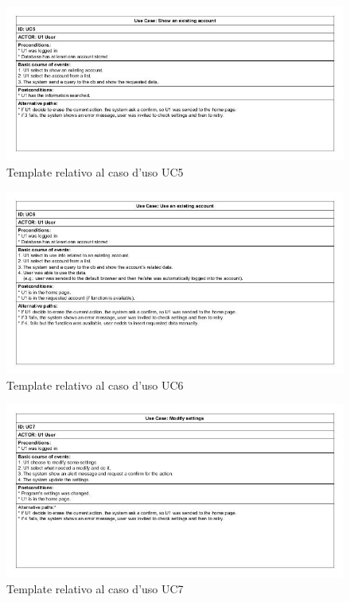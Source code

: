 \documentclass[a4paper,10pt]{report}
\begin{document}
			\begin{figure}[htbp]
				\centering
				\includegraphics[width = \textwidth]{immagini/USE_CASE_TEMPLATE/UC05.jpg}
				\caption{Template relativo al caso d'uso UC5}
				\end{figure}
			\begin{figure}[htbp]
				\centering
				\includegraphics[width = \textwidth]{immagini/USE_CASE_TEMPLATE/UC06.jpg}
				\caption{Template relativo al caso d'uso UC6}
				\end{figure}
			\begin{figure}[htbp]
				\centering
				\includegraphics[width = \textwidth]{immagini/USE_CASE_TEMPLATE/UC07.jpg}
				\caption{Template relativo al caso d'uso UC7}
				\end{figure}
\end{document}
